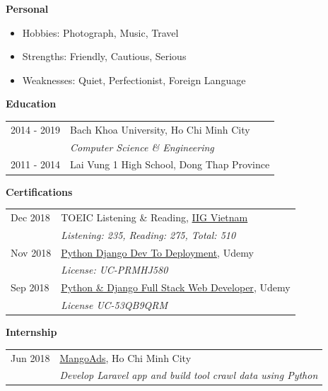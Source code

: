 \documentclass[12pt,a4paper]{article}
\begin{document}
	\textbf{\large\color{royalblue}Personal}
	\begin{itemize}
		\setlength\itemsep{1pt}
		\item Hobbies: Photograph, Music, Travel
		\item Strengths: Friendly, Cautious, Serious
		\item Weaknesses: Quiet, Perfectionist, Foreign Language
	\end{itemize}
	
	\textbf{\large\color{royalblue}Education}
	\begin{center}
		\begin{tabular}{m{20mm}  m{95mm}}
			\color{gray}2014 - 2019 & Bach Khoa University, Ho Chi Minh City \\
			& \textit{\small\color{gray}Computer Science \& Engineering} \\
			\color{gray}2011 - 2014 & Lai Vung 1 High School, Dong Thap Province \\
		\end{tabular}
	\end{center}
		
	\textbf{\large\color{royalblue}Certifications}
	\begin{center}
		\begin{tabular}{m{20mm}  m{95mm}}
			\color{gray}Dec 2018 & TOEIC Listening \& Reading, \href{iigvietnam.com}{IIG Vietnam} \\
			& \textit{\small\small\color{gray}Listening: 235, Reading: 275, Total: 510} \\
			\color{gray}Nov 2018 & \href{http://www.udemy.com/certificate/UC-PRMHJ580}{Python Django Dev To Deployment}, Udemy \\
			& \textit{\small\small\color{gray}License: UC-PRMHJ580} \\
			\color{gray}Sep 2018 & \href{http://www.udemy.com/certificate/UC-53QB9QRM}{Python \& Django Full Stack Web Developer}, Udemy \\
			& \textit{\small\small\color{gray}License UC-53QB9QRM} \\
		\end{tabular}
	\end{center}
	
	\textbf{\large\color{royalblue}Internship}
	\begin{center}
		\begin{tabular}{m{20mm} m{95mm}}
			\color{gray}Jun 2018 & \href{mangoads.vn}{MangoAds}, Ho Chi Minh City \\
			& \textit{\small\small\color{gray}Develop Laravel app and build tool crawl data using Python} \\
		\end{tabular}
	\end{center}
	
\end{document}
